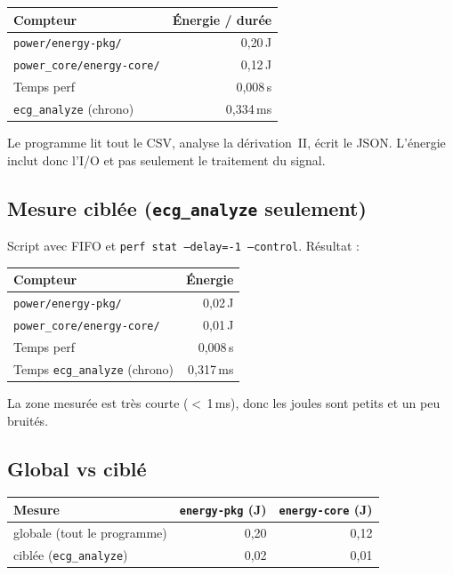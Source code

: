 \documentclass[a4paper,12pt]{article}
\begin{document}
\begin{center}
\begin{tabular}{|l|r|}
\hline
Compteur & Énergie / durée \\
\hline
\texttt{power/energy-pkg/} & 0{,}20\,J \\
\texttt{power\_core/energy-core/} & 0{,}12\,J \\
Temps perf & 0{,}008\,s \\
\texttt{ecg\_analyze} (chrono) & 0{,}334\,ms \\
\hline
\end{tabular}
\end{center}

Le programme lit tout le CSV, analyse la dérivation~II, écrit le JSON. L'énergie inclut donc l'I/O et pas seulement le traitement du signal.

\subsection{Mesure ciblée (\texttt{ecg\_analyze} seulement)}
Script avec FIFO et \texttt{perf stat --delay=-1 --control}. Résultat :
\begin{center}
\begin{tabular}{|l|r|}
\hline
Compteur & Énergie \\
\hline
\texttt{power/energy-pkg/} & 0{,}02\,J \\
\texttt{power\_core/energy-core/} & 0{,}01\,J \\
Temps perf & 0{,}008\,s \\
Temps \texttt{ecg\_analyze} (chrono) & 0{,}317\,ms \\
\hline
\end{tabular}
\end{center}

La zone mesurée est très courte ($<$\,1\,ms), donc les joules sont petits et un peu bruités.

\subsection{Global vs ciblé}
\begin{center}
\begin{tabular}{|l|r|r|}
\hline
Mesure & \texttt{energy-pkg} (J) & \texttt{energy-core} (J) \\
\hline
globale (tout le programme) & 0{,}20 & 0{,}12 \\
ciblée (\texttt{ecg\_analyze}) & 0{,}02 & 0{,}01 \\
\hline
\end{tabular}
\end{center}
\end{document}

